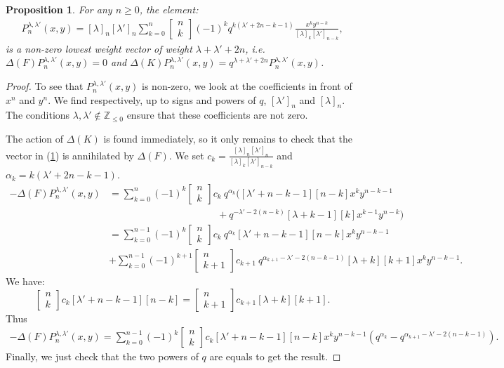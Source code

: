 \documentclass[a4paper,12pt]{article}
\numberwithin{equation}{section}
\newcommand{\Z}{\mathbb{Z}}
\newcommand{\qbinom}[2]{\begin{bmatrix}#1\\#2\end{bmatrix}}
\newtheorem{prop}[theo]{Proposition}
\theoremstyle{rem}
\theoremstyle{definition}
\begin{document}
\begin{prop}\label{prop_lowestvectors}
For any $n\geq 0$, the element:
\begin{align}
P_n^{\lambda,\lambda'}(x,y) = [\lambda]_n[\lambda']_n\sum_{k=0}^n \qbinom{n}{k}(-1)^k q^{k(\lambda'+2n-k-1)}\frac{x^ky^{n-k}}{[\lambda]_{k}[\lambda']_{n-k} },
\end{align}
is a non-zero lowest weight vector of weight $\lambda+\lambda'+2n$, i.e. $\Delta(F) P_n^{\lambda,\lambda'}(x,y)=0$ and $\Delta(K) P_n^{\lambda,\lambda'}(x,y)=q^{\lambda+\lambda'+2n}P_n^{\lambda,\lambda'}(x,y)$.
\end{prop}
\begin{proof}
To see that $P^{\lambda,\lambda'}_n(x,y)$ is non-zero, we look at the coefficients in front of $x^n$ and $y^n$. We find respectively, up to signs and powers of $q$, $[\lambda']_n$ and $[\lambda]_n$. The conditions $\lambda,\lambda'\notin \Z_{\leq 0}$ ensure that these coefficients are not zero.

The action of $\Delta(K)$ is found immediately, so it only remains to check that the vector in (\ref{prop_lowestvectors}) is annihilated by $\Delta(F)$. We set $c_k=\frac{[\lambda]_n[\lambda']_n}{[\lambda]_k[\lambda']_{n-k}}$ and $\alpha_k=k(\lambda'+2n-k-1)$.
\begin{align*}
-\Delta(F)P_n^{\lambda,\lambda'}(x,y)&=\sum_{k=0}^n(-1)^k \qbinom{n}{k}c_k~ q^{\alpha_k}([\lambda'+n-k-1][n-k] x^ky^{n-k-1}\\
&\qquad \qquad \qquad \qquad \qquad \quad +q^{-\lambda'-2(n-k)}[\lambda+k-1][k] x^{k-1}y^{n-k} )\\
&=\sum_{k=0}^{n-1}(-1)^k \qbinom{n}{k} c_k~ q^{\alpha_k}[\lambda'+n-k-1] [n-k] x^ky^{n-k-1}\\
&+ \sum_{k=0}^{n-1}(-1)^{k+1} \qbinom{n}{k+1} c_{k+1}~ q^{\alpha_{k+1}-\lambda'-2(n-k-1)}[\lambda+k][k+1]x^ky^{n-k-1} .
\end{align*}
We have:
\begin{equation*}
\qbinom{n}{k}c_k[\lambda'+n-k-1][n-k]= \qbinom{n}{k+1}c_{k+1}[\lambda+k][k+1].
\end{equation*}
Thus
\begin{multline*}
-\Delta(F)P_n^{\lambda,\lambda'}(x,y)=
\sum_{k=0}^{n-1}(-1)^k\qbinom{n}{k}c_k[\lambda'+n-k-1][n-k] x^ky^{n-k-1} (q^{\alpha_k}-q^{\alpha_{k+1}-\lambda'-2(n-k-1)}).
\end{multline*}
Finally, we just check that the two powers of $q$ are equals to get the result. 
\end{proof}
\end{document}
